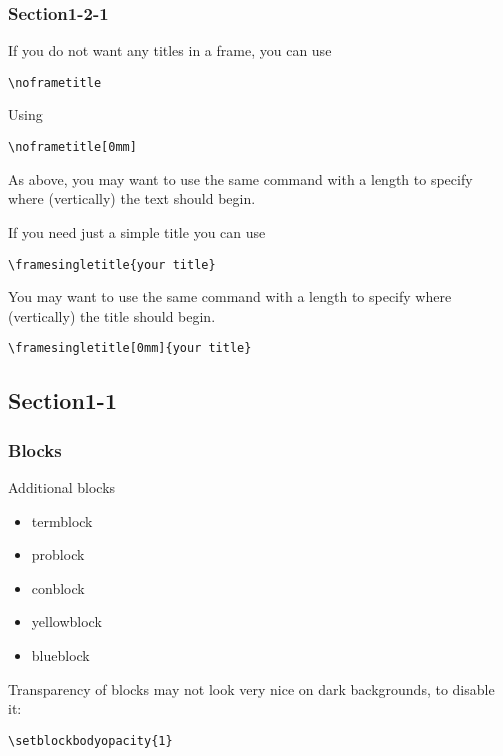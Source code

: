 \documentclass[t,compress,aspectratio=169]{beamer}
\begin{document}
\subsubsection{Section1-2-1}
\begin{frame}[fragile]
\noframetitle
If you do not want any titles in a frame, you can use
\begin{lstlisting}
\noframetitle
\end{lstlisting}
\end{frame}

\begin{frame}[fragile]
\noframetitle[0mm]
Using 
\begin{lstlisting}
\noframetitle[0mm]
\end{lstlisting}

\vskip 5mm
As above, you may want to use the same command with a length to specify where (vertically) the text should begin.
\end{frame}

\begin{frame}[fragile]
If you need just a simple title you can use
\begin{lstlisting}
\framesingletitle{your title}
\end{lstlisting}

\vskip 5mm
You may want to use the same command with a length to specify where (vertically) the title should begin.
\begin{lstlisting}
\framesingletitle[0mm]{your title}
\end{lstlisting}
\end{frame}

\subsection{Section1-1}
\begin{frame}[fragile]
\frametitle{Blocks}
Additional blocks
\begin{itemize}
  \item termblock
  \item problock
  \item conblock
  \item yellowblock
  \item blueblock
\end{itemize}
Transparency of blocks may not look very nice on dark backgrounds, to disable it:
\begin{lstlisting}
\setblockbodyopacity{1}
\end{lstlisting}
\end{frame}
\end{document}
